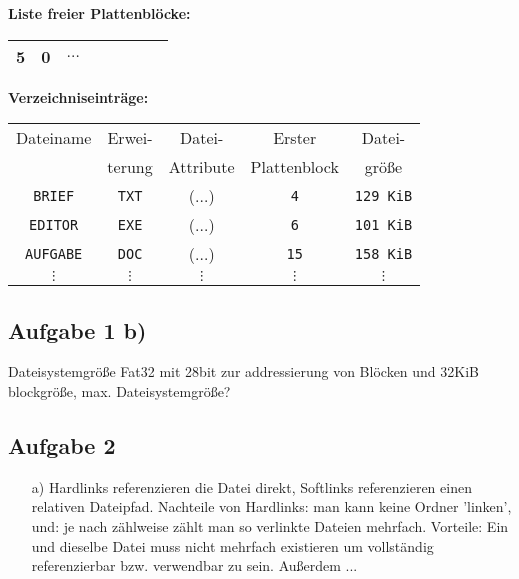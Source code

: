 \documentclass{scrartcl}
\begin{document}
%
\begin{minipage}[t]{0.6\columnwidth}%
  \vspace{1cm}
  \textbf{Liste freier Plattenbl\"{o}cke:}

  \begin{tabular}{|c|c|c|c|c|c|c|c}
    \hline
    5 & 0 & $\dots$\\
    \hline
  \end{tabular}

  \vspace{2cm}

  \textbf{Verzeichniseintr\"{a}ge:}

  \begin{tabular}{|c|c|c|c|c|}
    \hline
    Dateiname       & Erwei-       & Datei-    & Erster       & Datei-           \\
                    & terung       & Attribute & Plattenblock & gr\"{o}\ss{}e    \\\hline
    \texttt{BRIEF}  & \texttt{TXT} & ($\dots$) & \texttt{4}   & \texttt{129 KiB} \\
    \texttt{EDITOR} & \texttt{EXE} & ($\dots$) & \texttt{6}   & \texttt{101 KiB} \\
    \texttt{AUFGABE}& \texttt{DOC} & ($\dots$) & \texttt{15}  & \texttt{158 KiB} \\
    $\vdots$        & $\vdots$     & $\vdots$  & $\vdots$     & $\vdots$         \\
  \end{tabular}%
\end{minipage}


\subsection*{Aufgabe 1 b)}
Dateisystemgröße Fat32 mit 28bit zur addressierung von Blöcken und 32KiB blockgröße, max. Dateisystemgröße?



\subsection*{Aufgabe 2}

\begin{itemize}
  \item[a)] Hardlinks referenzieren die Datei direkt, Softlinks referenzieren einen relativen Dateipfad.
    Nachteile von Hardlinks: man kann keine Ordner 'linken', und: je nach zählweise zählt man so verlinkte Dateien mehrfach.
    Vorteile: Ein und dieselbe Datei muss nicht mehrfach existieren um vollständig referenzierbar bzw. verwendbar zu sein.
    Außerdem ...


\end{itemize}
\end{document}
